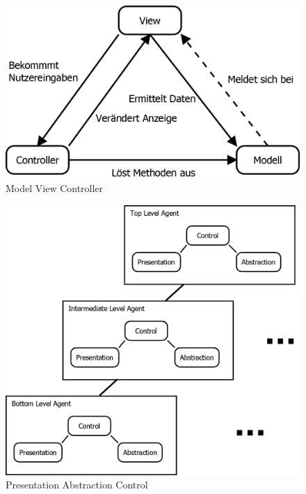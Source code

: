 \begin{figure}[H]
\centering
\caption{Model View Controller}
\label{Abb:MVC}
\includegraphics[scale=0.5]{Bilder/Diagramme/MVC.png}
\end{figure}

\begin{figure}[H]
\centering

\caption{Presentation Abstraction Control}
\label{Abb:PAC}
\includegraphics[scale=0.275]{Bilder/Diagramme/PAC.png}
\end{figure}